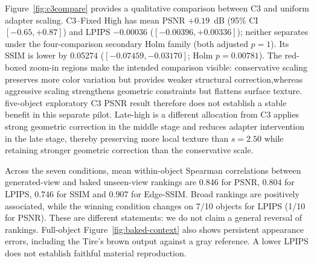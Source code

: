 \documentclass[times,twocolumn,final]{elsarticle}
\providecommand{\DIFadd}[1]{{\protect\color{blue} \sf #1}} %
\providecommand{\DIFdel}[1]{{\protect\color{red} \scriptsize #1}} %
\providecommand{\DIFaddbegin}{} %
\providecommand{\DIFaddend}{} %
\providecommand{\DIFdelbegin}{} %
\providecommand{\DIFdelend}{} %
\begin{document}
\DIFdel{Figure~\ref{fig:c3compare} provides a qualitative comparison between C3 and uniform adapter scaling. }\DIFdelend \DIFaddbegin \DIFadd{C3--Fixed High has mean PSNR $+0.19$~dB (95\% CI $[-0.65,+0.87]$) and LPIPS $-0.00036$ ($[-0.00396,+0.00336]$); neither separates under the four-comparison secondary Holm family (both adjusted $p=1$). Its SSIM is lower by 0.05274 ($[-0.07459,-0.03170]$; Holm $p=0.00781$). }\DIFaddend The \DIFdelbegin \DIFdel{red-boxed zoom-in regions make the intended comparison visible: conservative scaling preserves more color variation but provides weaker structural correction,whereas aggressive scaling strengthens geometric constraints but flattens surface texture. }\DIFdelend \DIFaddbegin \DIFadd{five-object exploratory C3 PSNR result therefore does not establish a stable benefit in this separate pilot. Late-high is a different allocation from }\DIFaddend C3\DIFdelbegin \DIFdel{applies strong geometric correction in the middle stage and reduces adapter intervention in the late stage, thereby preserving more local texture than $s = 2.50$ while retaining stronger geometric correction than the conservative scale}\DIFdelend .

\DIFdelbegin %
\DIFdelend \DIFaddbegin \DIFadd{Across the seven conditions, mean within-object Spearman correlations between generated-view and baked unseen-view rankings are 0.846 for PSNR, 0.804 for LPIPS, 0.746 for SSIM and 0.907 for Edge-SSIM. Broad rankings are positively associated, while the winning condition changes on 7/10 objects for LPIPS (1/10 for PSNR). These are different statements: we do not claim a general reversal of rankings. Full-object Figure~\ref{fig:baked-context} also shows persistent appearance errors, including the Tire's brown output against a gray reference. A lower LPIPS does not establish faithful material reproduction.
}\DIFaddend 
\end{document}
